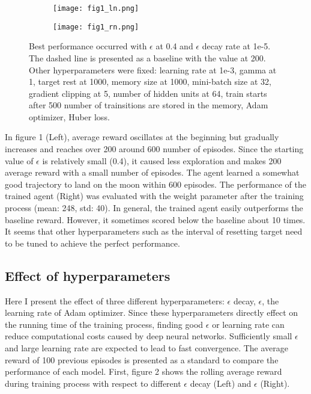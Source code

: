 \documentclass{article}
\begin{document}
\begin{figure}[h]
  \centering
   \begin{subfigure}[b]{0.4\linewidth}
    \texttt{[image: fig1\_ln.png]}
  \end{subfigure}
  \begin{subfigure}[b]{0.4\linewidth}
    \texttt{[image: fig1\_rn.png]}
      \end{subfigure}
  \caption{Best performance occurred with $\epsilon$ at 0.4 and $\epsilon$ decay rate at 1e-5. The dashed line is presented as a baseline with the value at 200. Other hyperparameters were fixed: learning rate at 1e-3, gamma at 1, target rest at 1000, memory size at 1000, mini-batch size at 32, gradient clipping at 5, number of hidden units at 64, train starts after 500 number of trainsitions are stored in the memory, Adam optimizer, Huber loss.}
\end{figure}

In figure 1 (Left), average reward oscillates at the beginning but gradually increases and reaches over 200 around 600 number of episodes. Since the starting value of $\epsilon$ is relatively small (0.4), it caused less exploration and makes 200 average reward with a small number of episodes. The agent learned a somewhat good trajectory to land on the moon within 600 episodes. The performance of the trained agent (Right) was evaluated with the weight parameter after the training process (mean: 248, std: 40).  In general, the trained agent easily outperforms the baseline reward. However, it sometimes scored below the baseline about 10 times. It seems that other hyperparameters such as the interval of resetting target need to be tuned to achieve the perfect performance.

\subsection{Effect of hyperparameters}
   
Here I present the effect of three different hyperparameters: $\epsilon$ decay, $\epsilon$, the learning rate of Adam optimizer. Since these hyperparameters directly effect on the running time of the training process, finding good $\epsilon$ or learning rate can reduce computational costs caused by deep neural networks. Sufficiently small $\epsilon$ and large learning rate are expected to lead to fast convergence. The average reward of 100 previous episodes is presented as a standard to compare the performance of each model. First, figure 2 shows the rolling average reward during training process with respect to different $\epsilon$ decay (Left) and $\epsilon$ (Right).
\end{document}
